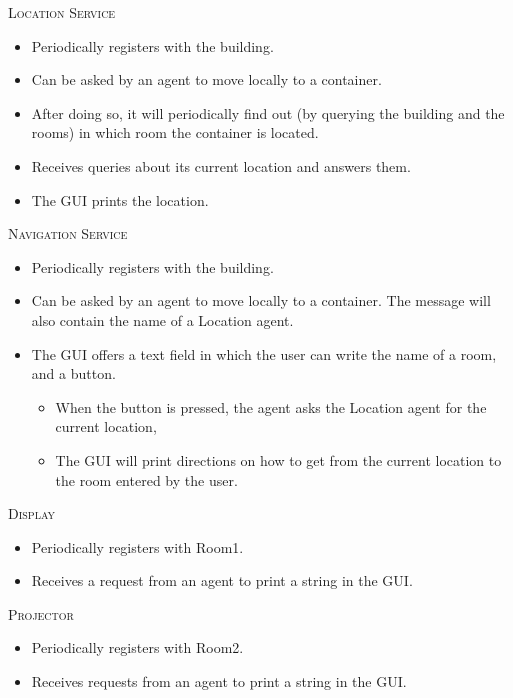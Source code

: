 \documentclass[a4paper, 12pt, twoside]{article}
\begin{document}


\textsc{Location Service}
\begin{itemize}
	\item Periodically registers with the building.
	\item Can be asked by an agent to move locally to a container.
	\item After doing so, it will periodically find out (by querying the building and the rooms) in which room the container is located.
	\item Receives queries about its current location and answers them.
	\item The GUI prints the location.
\end{itemize}


\textsc{Navigation Service}
\begin{itemize}
	\item Periodically registers with the building.
	\item Can be asked by an agent to move locally to a container. The message will also contain the name of a Location agent.
	\item The GUI offers a text field in which the user can write the name of a room, and a button.
	\begin{itemize}
		\item When the button is pressed, the agent asks the Location agent for the current location,
		\item The GUI will print directions on how to get from the current location to the room entered by the user.
	\end{itemize}
\end{itemize}

\newpage

\textsc{Display}
\begin{itemize}
	\item Periodically registers with Room1.
	\item Receives a request from an agent to print a string in the GUI.
\end{itemize}


\textsc{Projector}
\begin{itemize}
	\item Periodically registers with Room2.
	\item Receives requests from an agent to print a string in the GUI.
\end{itemize}
\end{document}
